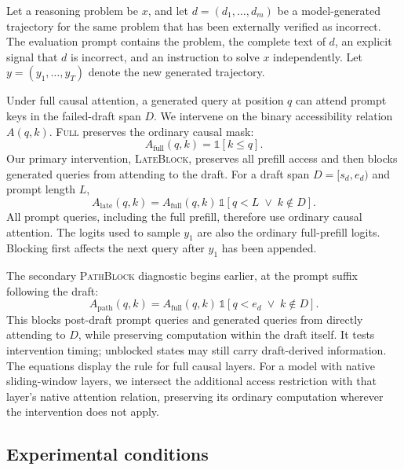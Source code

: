 \documentclass{article}
\newcommand{\fullaccess}{\textsc{Full}}
\newcommand{\lateblock}{\textsc{LateBlock}}
\newcommand{\pathblock}{\textsc{PathBlock}}
\begin{document}
Let a reasoning problem be $x$, and let $d=(d_1,\ldots,d_m)$ be a model-generated trajectory for the same problem that has been externally verified as incorrect. The evaluation prompt contains the problem, the complete text of $d$, an explicit signal that $d$ is incorrect, and an instruction to solve $x$ independently. Let $y=(y_1,\ldots,y_T)$ denote the new generated trajectory.

Under full causal attention, a generated query at position $q$ can attend prompt keys in the failed-draft span $D$. We intervene on the binary accessibility relation $A(q,k)$. \fullaccess{} preserves the ordinary causal mask:
\begin{equation}
    A_{\mathrm{full}}(q,k)=\mathbb{1}[k\leq q].
\end{equation}
Our primary intervention, \lateblock{}, preserves all prefill access and then blocks generated queries from attending to the draft. For a draft span $D=[s_d,e_d)$ and prompt length $L$,
\begin{equation}
    A_{\mathrm{late}}(q,k)
    = A_{\mathrm{full}}(q,k)\,\mathbb{1}[q<L \;\lor\; k\notin D].
    \label{eq:late}
\end{equation}
All prompt queries, including the full prefill, therefore use ordinary causal attention. The logits used to sample $y_1$ are also the ordinary full-prefill logits. Blocking first affects the next query after $y_1$ has been appended.

The secondary \pathblock{} diagnostic begins earlier, at the prompt suffix following the draft:
\begin{equation}
    A_{\mathrm{path}}(q,k)
    = A_{\mathrm{full}}(q,k)\,\mathbb{1}[q<e_d \;\lor\; k\notin D].
    \label{eq:path}
\end{equation}
This blocks post-draft prompt queries and generated queries from directly attending to $D$, while preserving computation within the draft itself. It tests intervention timing; unblocked states may still carry draft-derived information. The equations display the rule for full causal layers. For a model with native sliding-window layers, we intersect the additional access restriction with that layer's native attention relation, preserving its ordinary computation wherever the intervention does not apply.

\subsection{Experimental conditions}
\end{document}

